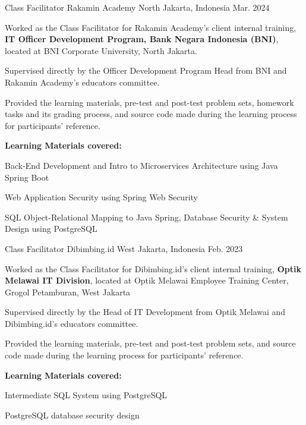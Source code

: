 \begin{cventries}
    \cventry
    {Class Facilitator} %
    {Rakamin Academy} %
    {North Jakarta, Indonesia} %
    {Mar. 2024} %
    {
      \begin{cvitems}
        \item {Worked as the Class Facilitator for Rakamin Academy's client internal training, \textbf{IT Officer Development Program, Bank Negara Indonesia (BNI)}, located at BNI Corporate University, North Jakarta.}
        \item {Supervised directly by the Officer Development Program Head from BNI and Rakamin Academy's educators committee.}
        \item {Provided the learning materials, pre-test and post-test problem sets, homework tasks and its grading process, and source code made during the learning process for participants' reference.}
        \item {\textbf{Learning Materials covered:}
          \begin{cvsubitems}
            \item {Back-End Development and Intro to Microservices Architecture using Java Spring Boot}
            \item {Web Application Security using Spring Web Security}
            \item {SQL Object-Relational Mapping to Java Spring, Database Security \& System Design using PostgreSQL}
          \end{cvsubitems}
        }
      \end{cvitems}
    }

    \cventry
    {Class Facilitator} %
    {Dibimbing.id} %
    {West Jakarta, Indonesia} %
    {Feb. 2023} %
    {
      \begin{cvitems}
        \item {Worked as the Class Facilitator for Dibimbing.id's client internal training, \textbf{Optik Melawai IT Division}, located at Optik Melawai Employee Training Center, Grogol Petamburan, West Jakarta}
        \item {Supervised directly by the Head of IT Development from Optik Melawai and Dibimbing.id's educators committee.}
        \item {Provided the learning materials, pre-test and post-test problem sets, and source code made during the learning process for participants' reference.}
        \item {\textbf{Learning Materials covered:}
          \begin{cvsubitems}
            \item {Intermediate SQL System using PostgreSQL}
            \item {PostgreSQL database security design}
          \end{cvsubitems}
        }
      \end{cvitems}
    }


\end{cventries}
